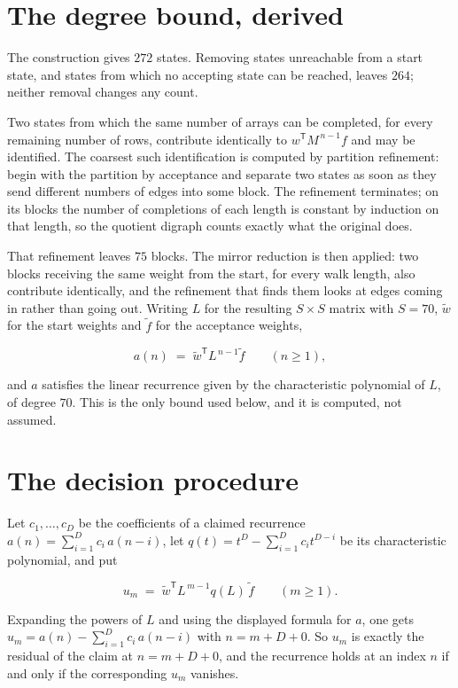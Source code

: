 \documentclass[11pt]{article}
\theoremstyle{definition}
\begin{document}
\section{The degree bound, derived}

The construction gives $272$ states. Removing states unreachable from a start state, and states from which no accepting state can be reached, leaves $264$; neither removal changes any count.

Two states from which the same number of arrays can be completed, for every remaining number of rows, contribute identically to $w^{\mathsf T}M^{\,n-1}f$ and may be identified. The coarsest such identification is computed by partition refinement: begin with the partition by acceptance and separate two states as soon as they send different numbers of edges into some block. The refinement terminates; on its blocks the number of completions of each length is constant by induction on that length, so the quotient digraph counts exactly what the original does.

That refinement leaves $75$ blocks. The mirror reduction is then applied: two blocks receiving the same weight from the start, for every walk length, also contribute identically, and the refinement that finds them looks at edges coming in rather than going out. Writing $L$ for the resulting $S \times S$ matrix with $S = 70$, $\tilde w$ for the start weights and $\tilde f$ for the acceptance weights,

\[a(n) \;=\; \tilde w^{\mathsf T} L^{\,n-1} \tilde f \qquad (n \ge 1),\]

and $a$ satisfies the linear recurrence given by the characteristic polynomial of $L$, of degree $70$. This is the only bound used below, and it is computed, not assumed.

\section{The decision procedure}

Let $c_1,\dots,c_D$ be the coefficients of a claimed recurrence $a(n) = \sum_{i=1}^{D} c_i\,a(n-i)$, let $q(t) = t^{D} - \sum_{i=1}^{D} c_i t^{D-i}$ be its characteristic polynomial, and put

\[u_m \;=\; \tilde w^{\mathsf T} L^{\,m-1} q(L)\,\tilde f \qquad (m \ge 1).\]

Expanding the powers of $L$ and using the displayed formula for $a$, one gets $u_m = a(n) - \sum_{i=1}^{D} c_i\,a(n-i)$ with $n = m + D + 0$. So $u_m$ is exactly the residual of the claim at $n = m + D + 0$, and the recurrence holds at an index $n$ if and only if the corresponding $u_m$ vanishes.
\end{document}
